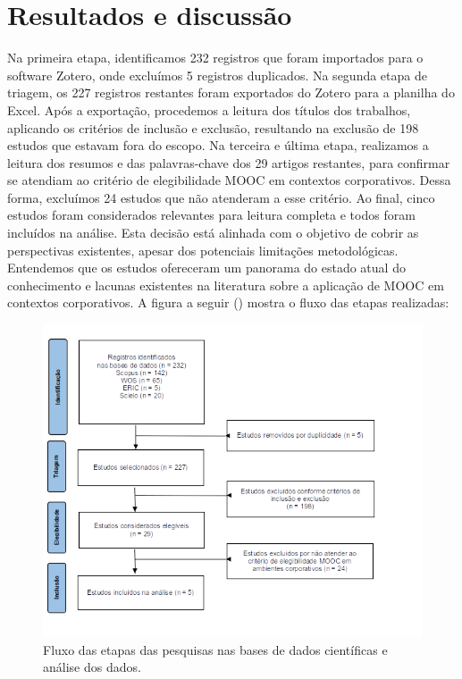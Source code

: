 \documentclass[portuguese]{textolivre}
\begin{document}
\section{Resultados e discussão}\label{sec-formato}
Na primeira etapa, identificamos 232 registros que foram importados para o software Zotero, onde excluímos 5 registros duplicados.  Na segunda etapa de triagem, os 227 registros restantes foram exportados do Zotero para a planilha do Excel. Após a exportação, procedemos a leitura dos títulos dos trabalhos, aplicando os critérios de inclusão e exclusão, resultando na exclusão de 198 estudos que estavam fora do escopo. Na terceira e última etapa, realizamos a leitura dos resumos e das palavras-chave dos 29 artigos restantes, para confirmar se atendiam ao critério de elegibilidade MOOC em contextos corporativos. Dessa forma, excluímos 24 estudos que não atenderam a esse critério. Ao final, cinco estudos foram considerados relevantes para leitura completa e todos foram incluídos na análise. Esta decisão está alinhada com o objetivo de cobrir as perspectivas existentes, apesar dos potenciais limitações metodológicas. Entendemos que os estudos ofereceram um panorama do estado atual do conhecimento e lacunas existentes na literatura sobre a aplicação de MOOC em contextos corporativos. A figura a seguir () mostra o fluxo das etapas realizadas:

\begin{figure}[h]
\centering
\begin{minipage}{0.75\linewidth}
\includegraphics[width=\linewidth]{Fig1.png}
\caption{Fluxo das etapas das pesquisas nas bases de dados científicas e análise dos dados.}
\label{fig1}
\end{minipage}
\end{figure}
\end{document}

